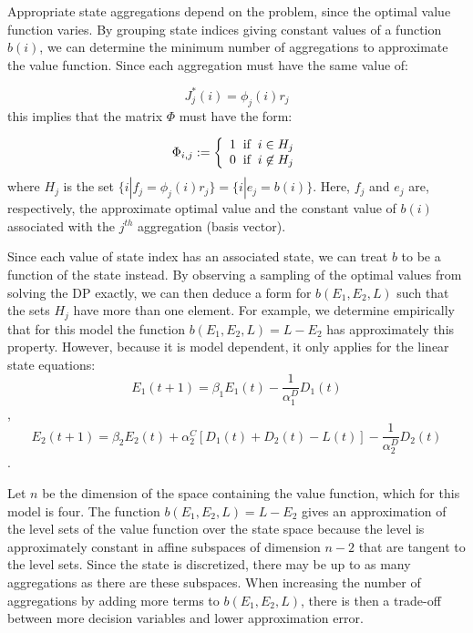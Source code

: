\documentclass[conference]{IEEEtran}
\begin{document}
    Appropriate state aggregations depend on the problem, since the optimal value function varies. By grouping state indices giving constant values of a function $b(i)$, we can determine the minimum number of aggregations to approximate the value function. Since each aggregation must have the same value of:
    
    \begin{equation}
        J^{*}_{j}(i) = \phi_{j}(i)r_{j}
    \end{equation}this implies that the matrix $\Phi$ must have the form:
    
    \begin{displaymath}
        \Phi_{i,j}:=\left\{
            \begin{array}{l}
            1 \hspace{0.2cm} \text{if} \hspace{0.2cm} i\in H_{j}\\
            0 \hspace{0.2cm} \text{if} \hspace{0.2cm} i\not\in H_{j}
            \end{array}
            \right.
    \end{displaymath}where $H_{j}$ is the set $\{i|f_{j} = \phi_{j}(i)r_{j}\}=\{i|e_{j} = b(i)\}$. Here, $f_{j}$ and $e_{j}$ are, respectively, the approximate optimal value and the constant value of $b(i)$ associated with the $j^{th}$ aggregation (basis vector).
    
    Since each value of state index has an associated state, we can treat $b$ to be a function of the state instead. By observing a sampling of the optimal values from solving the DP exactly, we can then deduce a form for $b(E_{1},E_{2},L)$ such that the sets $H_{j}$ have more than one element. For example, we determine empirically that for this model the function $b(E_{1},E_{2},L)=L-E_{2}$ has approximately this property. However, because it is model dependent, it only applies for the linear state equations:
	\begin{displaymath}E_{1}(t+1)=\beta_{1}E_{1}(t)-\frac{1}{\alpha_{1}^{D}}D_{1}(t)\end{displaymath},
	\begin{displaymath}E_{2}(t+1)=\beta_{2}E_{2}(t)+\alpha_{2}^{C}[D_{1}(t)+D_{2}(t)-L(t)]-\frac{1}{\alpha_{2}^{D}}D_{2}(t)\end{displaymath}.
	
	Let $n$ be the dimension of the space containing the value function, which for this model is four. The function $b(E_{1},E_{2},L)=L-E_{2}$ gives an approximation of the level sets of the value function over the state space because the level is approximately constant in affine subspaces of dimension $n-2$ that are tangent to the level sets. Since the state is discretized, there may be up to as many aggregations as there are these subspaces. When increasing the number of aggregations by adding more terms to $b(E_{1},E_{2},L)$, there is then a trade-off between more decision variables and lower approximation error. %
	
\end{document}
